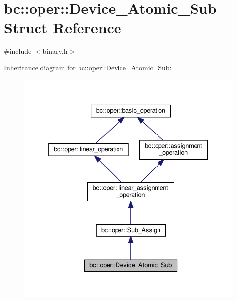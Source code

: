 \hypertarget{structbc_1_1oper_1_1Device__Atomic__Sub}{}\section{bc\+:\+:oper\+:\+:Device\+\_\+\+Atomic\+\_\+\+Sub Struct Reference}
\label{structbc_1_1oper_1_1Device__Atomic__Sub}


{\ttfamily \#include $<$binary.\+h$>$}



Inheritance diagram for bc\+:\+:oper\+:\+:Device\+\_\+\+Atomic\+\_\+\+Sub\+:\nopagebreak
\begin{figure}[H]
\begin{center}
\leavevmode
\includegraphics[width=332pt]{structbc_1_1oper_1_1Device__Atomic__Sub__inherit__graph}
\end{center}
\end{figure}


